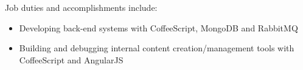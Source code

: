 \normalsize
Job duties and accomplishments include:
\small
\begin{itemize}
    \item Developing back-end systems with CoffeeScript, MongoDB and RabbitMQ
    \item Building and debugging internal content creation/management tools with CoffeeScript and AngularJS
\end{itemize}
\normalsize
\medskip

